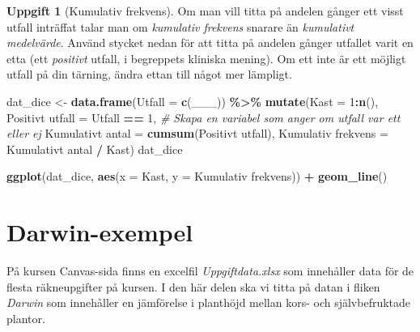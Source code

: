 \documentclass[
]{book}
\newenvironment{Shaded}{\begin{snugshade}}{\end{snugshade}}
\newcommand{\AttributeTok}[1]{\textcolor[rgb]{0.13,0.29,0.53}{#1}}
\newcommand{\CommentTok}[1]{\textcolor[rgb]{0.56,0.35,0.01}{\textit{#1}}}
\newcommand{\DecValTok}[1]{\textcolor[rgb]{0.00,0.00,0.81}{#1}}
\newcommand{\FunctionTok}[1]{\textcolor[rgb]{0.13,0.29,0.53}{\textbf{#1}}}
\newcommand{\NormalTok}[1]{#1}
\newcommand{\OtherTok}[1]{\textcolor[rgb]{0.56,0.35,0.01}{#1}}
\newcommand{\SpecialCharTok}[1]{\textcolor[rgb]{0.81,0.36,0.00}{\textbf{#1}}}
\newcommand{\StringTok}[1]{\textcolor[rgb]{0.31,0.60,0.02}{#1}}
\theoremstyle{definition}
\theoremstyle{definition}
\theoremstyle{definition}
\newtheorem{exercise}{Uppgift}[chapter]
\theoremstyle{definition}
\theoremstyle{remark}
\begin{document}
\begin{exercise}[Kumulativ frekvens]

Om man vill titta på andelen gånger ett visst utfall inträffat talar man om \emph{kumulativ frekvens} snarare än \emph{kumulativt medelvärde}. Använd stycket nedan för att titta på andelen gånger utfallet varit en etta (ett \emph{positivt} utfall, i begreppets kliniska mening). Om ett inte är ett möjligt utfall på din tärning, ändra ettan till något mer lämpligt.

\begin{Shaded}
\begin{Highlighting}[]
\NormalTok{dat\_dice }\OtherTok{\textless{}{-}} \FunctionTok{data.frame}\NormalTok{(}\AttributeTok{Utfall =} \FunctionTok{c}\NormalTok{(\_\_\_)) }\SpecialCharTok{\%\textgreater{}\%} 
  \FunctionTok{mutate}\NormalTok{(}\AttributeTok{Kast =} \DecValTok{1}\SpecialCharTok{:}\FunctionTok{n}\NormalTok{(),}
         \StringTok{\textasciigrave{}}\AttributeTok{Positivt utfall}\StringTok{\textasciigrave{}} \OtherTok{=}\NormalTok{ Utfall }\SpecialCharTok{==} \DecValTok{1}\NormalTok{,                       }\CommentTok{\# Skapa en variabel som anger om utfall var ett eller ej}
         \StringTok{\textasciigrave{}}\AttributeTok{Kumulativt antal}\StringTok{\textasciigrave{}} \OtherTok{=} \FunctionTok{cumsum}\NormalTok{(}\StringTok{\textasciigrave{}}\AttributeTok{Positivt utfall}\StringTok{\textasciigrave{}}\NormalTok{),}
         \StringTok{\textasciigrave{}}\AttributeTok{Kumulativ frekvens}\StringTok{\textasciigrave{}} \OtherTok{=} \StringTok{\textasciigrave{}}\AttributeTok{Kumulativt antal}\StringTok{\textasciigrave{}} \SpecialCharTok{/}\NormalTok{ Kast)}
\NormalTok{dat\_dice}

\FunctionTok{ggplot}\NormalTok{(dat\_dice, }\FunctionTok{aes}\NormalTok{(}\AttributeTok{x =}\NormalTok{ Kast, }\AttributeTok{y =} \StringTok{\textasciigrave{}}\AttributeTok{Kumulativ frekvens}\StringTok{\textasciigrave{}}\NormalTok{)) }\SpecialCharTok{+}
  \FunctionTok{geom\_line}\NormalTok{()}
\end{Highlighting}
\end{Shaded}

\end{exercise}

\hypertarget{darwin-exempel}{%
\section{Darwin-exempel}\label{darwin-exempel}}

På kursen Canvas-sida finns en excelfil \emph{Uppgiftdata.xlsx} som innehåller data för de flesta räkneupgifter på kursen. I den här delen ska vi titta på datan i fliken \emph{Darwin} som innehåller en jämförelse i planthöjd mellan kors- och självbefruktade plantor.
\end{document}
